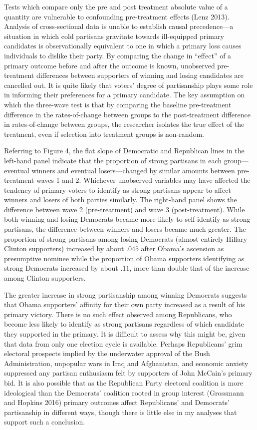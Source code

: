 \documentclass[
]{article}
\begin{document}
Tests which compare only the pre and post treatment absolute value of a quantity are vulnerable to confounding pre-treatment effects (Lenz 2013). Analysis of cross-sectional data is unable to establish causal precedence---a situation in which cold partisans gravitate towards ill-equipped primary candidates is observationally equivalent to one in which a primary loss causes individuals to dislike their party. By comparing the change in ``effect'' of a primary outcome before and after the outcome is known, unobserved pre-treatment differences between supporters of winning and losing candidates are cancelled out. It is quite likely that voters' degree of partisanship plays some role in informing their preferences for a primary candidate. The key assumption on which the three-wave test is that by comparing the baseline pre-treatment difference in the rates-of-change between groups to the post-treatment difference in rates-of-change between groups, the researcher isolates the true effect of the treatment, even if selection into treatment groups is non-random.

Referring to Figure 4, the flat slope of Democratic and Republican lines in the left-hand panel indicate that the proportion of strong partisans in each group---eventual winners and eventual losers---changed by similar amounts between pre-treatment waves 1 and 2. Whichever unobserved variables may have affected the tendency of primary voters to identify as strong partisans appear to affect winners and losers of both parties similarly. The right-hand panel shows the difference between wave 2 (pre-treatment) and wave 3 (post-treatment). While both winning and losing Democrats became more likely to self-identify as strong-partisans, the difference between winners and losers became much greater. The proportion of strong partisans among losing Democrats (almost entirely Hillary Clinton supporters) increased by about \(.045\) after Obama's ascension as presumptive nominee while the proportion of Obama supporters identifying as strong Democrats increased by about \(.11\), more than double that of the increase among Clinton supporters.

The greater increase in strong partisanship among winning Democrats suggests that Obama supporters' affinity for their own party increased as a result of his primary victory. There is no such effect observed among Republicans, who become less likely to identify as strong partisans regardless of which candidate they supported in the primary. It is difficult to assess why this might be, given that data from only one election cycle is available. Perhaps Republicans' grim electoral prospects implied by the underwater approval of the Bush Administration, unpopular wars in Iraq and Afghanistan, and economic anxiety suppressed any partisan enthusiasm felt by supporters of John McCain's primary bid. It is also possible that as the Republican Party electoral coalition is more ideological than the Democrats' coalition rooted in group interest (Grossmann and Hopkins 2016) primary outcomes affect Republicans' and Democrats' partisanship in different ways, though there is little else in my analyses that support such a conclusion.
\end{document}
